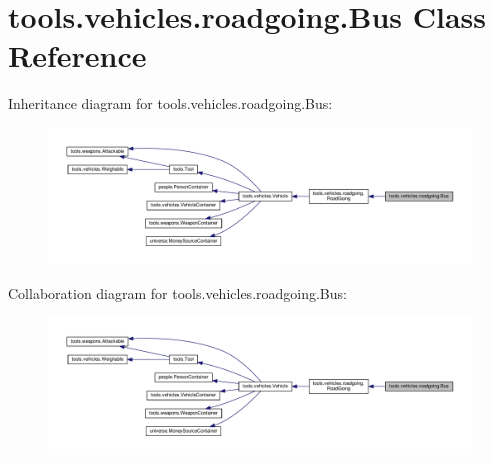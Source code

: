 \hypertarget{classtools_1_1vehicles_1_1roadgoing_1_1_bus}{}\section{tools.\+vehicles.\+roadgoing.\+Bus Class Reference}
\label{classtools_1_1vehicles_1_1roadgoing_1_1_bus}


Inheritance diagram for tools.\+vehicles.\+roadgoing.\+Bus\+:
\nopagebreak
\begin{figure}[H]
\begin{center}
\leavevmode
\includegraphics[width=350pt]{classtools_1_1vehicles_1_1roadgoing_1_1_bus__inherit__graph}
\end{center}
\end{figure}


Collaboration diagram for tools.\+vehicles.\+roadgoing.\+Bus\+:
\nopagebreak
\begin{figure}[H]
\begin{center}
\leavevmode
\includegraphics[width=350pt]{classtools_1_1vehicles_1_1roadgoing_1_1_bus__coll__graph}
\end{center}
\end{figure}
